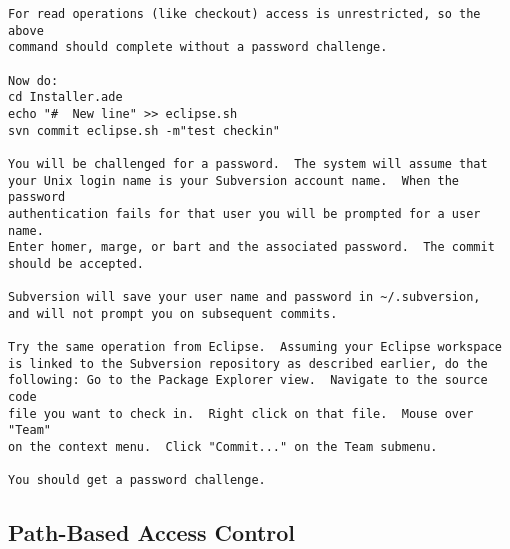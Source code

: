 \begin{verbatim}
For read operations (like checkout) access is unrestricted, so the above
command should complete without a password challenge.

Now do:
cd Installer.ade
echo "#  New line" >> eclipse.sh
svn commit eclipse.sh -m"test checkin"

You will be challenged for a password.  The system will assume that
your Unix login name is your Subversion account name.  When the password
authentication fails for that user you will be prompted for a user name.
Enter homer, marge, or bart and the associated password.  The commit
should be accepted.

Subversion will save your user name and password in ~/.subversion,
and will not prompt you on subsequent commits.

Try the same operation from Eclipse.  Assuming your Eclipse workspace
is linked to the Subversion repository as described earlier, do the
following: Go to the Package Explorer view.  Navigate to the source code
file you want to check in.  Right click on that file.  Mouse over "Team"
on the context menu.  Click "Commit..." on the Team submenu.

You should get a password challenge.

\end{verbatim}

\subsection{Path-Based Access Control}

